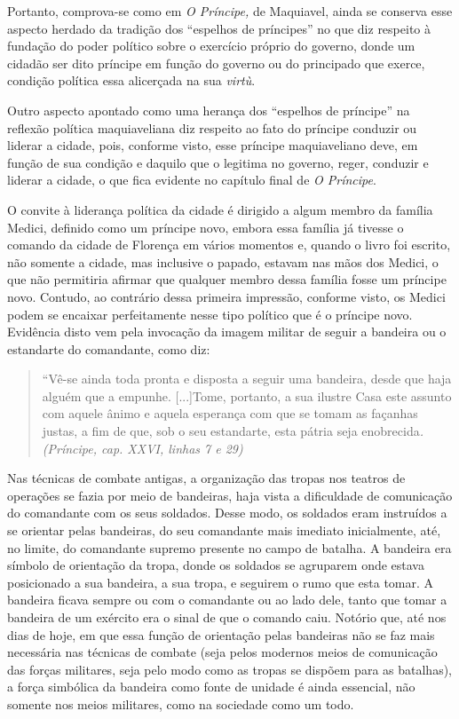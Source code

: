 Portanto, comprova-se como em \emph{O Príncipe,} de Maquiavel, ainda se
conserva esse aspecto herdado da tradição dos ``espelhos de príncipes''
no que diz respeito à fundação do poder político sobre o exercício
próprio do governo, donde um cidadão ser dito príncipe em função do
governo ou do principado que exerce, condição política essa alicerçada
na sua \emph{virtù}.

Outro aspecto apontado como uma herança dos ``espelhos de príncipe'' na
reflexão política maquiaveliana diz respeito ao fato do príncipe
conduzir ou liderar a cidade, pois, conforme visto, esse príncipe
maquiaveliano deve, em função de sua condição e daquilo que o legitima
no governo, reger, conduzir e liderar a cidade, o que fica evidente no
capítulo final de \emph{O Príncipe}.

O convite à liderança política da cidade é dirigido a algum membro da
família Medici, definido como um príncipe novo, embora essa família já
tivesse o comando da cidade de Florença em vários momentos e, quando o
livro foi escrito, não somente a cidade, mas inclusive o papado, estavam
nas mãos dos Medici, o que não permitiria afirmar que qualquer membro
dessa família fosse um príncipe novo. Contudo, ao contrário dessa
primeira impressão, conforme visto, os Medici podem se encaixar
perfeitamente nesse tipo político que é o príncipe novo. Evidência disto
vem pela invocação da imagem militar de seguir a bandeira ou o
estandarte do comandante, como diz:

\begin{quote}
``Vê-se ainda toda pronta e disposta a seguir uma bandeira, desde
que haja alguém que a empunhe. {[}...{]}Tome, portanto, a sua ilustre
Casa este assunto com aquele ânimo e aquela esperança com que se tomam
as façanhas justas, a fim de que, sob o seu estandarte, esta pátria seja
enobrecida\emph{. (Príncipe, cap. XXVI, linhas 7 e 29)}
\end{quote}

Nas técnicas de combate antigas, a organização das tropas nos teatros de
operações se fazia por meio de bandeiras, haja vista a dificuldade de
comunicação do comandante com os seus soldados. Desse modo, os soldados
eram instruídos a se orientar pelas bandeiras, do seu comandante mais
imediato inicialmente, até, no limite, do comandante supremo presente no
campo de batalha. A bandeira era símbolo de orientação da tropa, donde
os soldados se agruparem onde estava posicionado a sua bandeira, a sua
tropa, e seguirem o rumo que esta tomar. A bandeira ficava sempre ou com
o comandante ou ao lado dele, tanto que tomar a bandeira de um exército
era o sinal de que o comando caiu. Notório que, até nos dias de hoje, em
que essa função de orientação pelas bandeiras não se faz mais necessária
nas técnicas de combate (seja pelos modernos meios de comunicação das
forças militares, seja pelo modo como as tropas se dispõem para as
batalhas), a força simbólica da bandeira como fonte de unidade é ainda
essencial, não somente nos meios militares, como na sociedade como um
todo.

